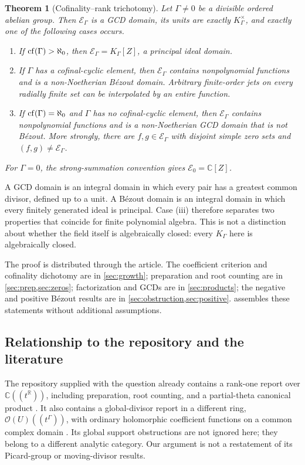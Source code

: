 \documentclass[11pt]{article}
\newtheorem{theorem}{Theorem}[section]
\theoremstyle{plain}
\theoremstyle{plain}
\theoremstyle{plain}
\theoremstyle{definition}
\theoremstyle{definition}
\theoremstyle{definition}
\theoremstyle{remark}
\newcommand{\C}{\mathbb C}\newcommand{\R}{\mathbb R}
\newcommand{\K}{K_\Gamma}\newcommand{\E}{\mathcal E_\Gamma}
\begin{document}
\begin{theorem}[Cofinality--rank trichotomy]\label{thm:main}
Let $\Gamma\ne0$ be a divisible ordered abelian group. Then $\E$ is a GCD
domain, its units are exactly $\K^\times$, and exactly one of the following
cases occurs.
\begin{enumerate}[label=\textnormal{(\roman*)},leftmargin=2em]
\item If $\operatorname{cf}(\Gamma)>\aleph_0$, then $\E=\K[Z]$, a principal ideal domain.
\item If $\Gamma$ has a cofinal-cyclic element, then $\E$ contains
nonpolynomial functions and is a non-Noetherian B\'ezout domain. Arbitrary
finite-order jets on every radially finite set can be interpolated by an
entire function.
\item If $\operatorname{cf}(\Gamma)=\aleph_0$ and $\Gamma$ has no cofinal-cyclic element,
then $\E$ contains nonpolynomial functions and is a non-Noetherian GCD
domain that is not B\'ezout. More strongly, there are $f,g\in\E$ with
disjoint simple zero sets and $(f,g)\ne\E$.
\end{enumerate}
For $\Gamma=0$, the strong-summation convention gives $\mathcal E_0=\C[Z]$.
\end{theorem}

A GCD domain is an integral domain in which every pair has a greatest
common divisor, defined up to a unit. A B\'ezout domain is an integral
domain in which every finitely generated ideal is principal. Case (iii)
therefore separates two properties that coincide for finite polynomial
algebra. This is not a distinction about whether the field itself is
algebraically closed: every $\K$ here is algebraically closed.

The proof is distributed through the article. The coefficient criterion
and cofinality dichotomy are in \cref{sec:growth}; preparation and root
counting are in \cref{sec:prep,sec:zeros}; factorization and GCDs are in
\cref{sec:products}; the negative and positive B\'ezout results are in
\cref{sec:obstruction,sec:positive}.  assembles
these statements without additional assumptions.

\subsection{Relationship to the repository and the literature}
The repository supplied with the question already contains a rank-one
report over $\C((t^\R))$, including preparation, root counting, and a
partial-theta canonical product \cite{RepoRankOne}. It also contains a
global-divisor report in a different ring,
$\mathcal O(U)((t^\Gamma))$, with ordinary holomorphic coefficient
functions on a common complex domain \cite{RepoDivisors}. Its global
support obstructions are not ignored here; they belong to a different
analytic category. Our argument is not a restatement of its Picard-group
or moving-divisor results.
\end{document}
